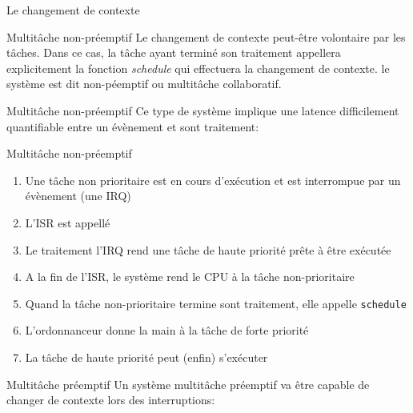 \begin{frame}{Le changement de contexte}
  \begin{center}
  \end{center}
\end{frame}

\begin{frame}{Multitâche non-préemptif}
  Le changement de contexte  peut-être volontaire par les tâches. Dans
  ce   cas,  la   tâche   ayant  terminé   son  traitement   appellera
  explicitement   la  fonction   \emph{schedule}   qui  effectuera   la
  changement  de   contexte.  le  système  est   dit  non-péemptif  ou
  multitâche collaboratif.
\end{frame}

\begin{frame}{Multitâche non-préemptif}
  Ce type  de système implique une  latence difficilement quantifiable
  entre un évènement et sont traitement:
  \begin{center}
  \end{center}
\end{frame}

\begin{frame}{Multitâche non-préemptif}
  \begin{enumerate}
  \item  Une tâche  non prioritaire  est en  cours d'exécution  et est
    interrompue par un évènement (une IRQ)
  \item L'ISR est appellé
  \item Le traitement  l'IRQ rend une tâche de  haute priorité prête à
    être exécutée
  \item  A  la fin  de  l'ISR,  le système  rend  le  CPU  à la  tâche
    non-prioritaire
  \item Quand  la tâche non-prioritaire termine  sont traitement, elle
    appelle \texttt{schedule}
  \item L'ordonnanceur donne la main à la tâche de forte priorité
  \item La tâche de haute priorité peut (enfin) s'exécuter
  \end{enumerate}
\end{frame}

\begin{frame}{Multitâche préemptif}
  Un  système  multitâche préemptif  va  être  capable  de changer  de
  contexte lors des interruptions:
  \begin{center}
  \end{center}
\end{frame}

